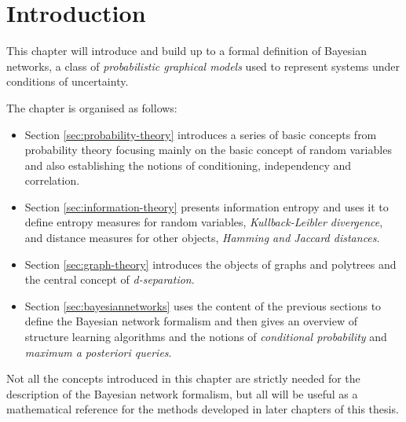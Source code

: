 \section{Introduction} \label{sec:mathematical-background-introduction}
This chapter will introduce and build up to a formal definition of Bayesian networks, a class of \textit{probabilistic graphical models} used to represent systems under conditions of uncertainty.

The chapter is organised as follows:
\begin{itemize}
  \item Section \ref{sec:probability-theory} introduces a series of basic concepts from probability theory focusing mainly on the basic concept of random variables and also establishing the notions of conditioning, independency and correlation.
  \item Section \ref{sec:information-theory} presents information entropy and uses it to define entropy measures for random variables, \textit{Kullback-Leibler divergence}, and distance measures for other objects, \textit{Hamming and Jaccard distances}.
  \item Section \ref{sec:graph-theory} introduces the objects of graphs and polytrees and the central concept of \textit{d-separation}.
  \item Section \ref{sec:bayesiannetworks} uses the content of the previous sections to define the Bayesian network formalism and then gives an overview of structure learning algorithms and the notions of \textit{conditional probability} and \textit{maximum a posteriori queries}.
\end{itemize}

Not all the concepts introduced in this chapter are strictly needed for the description of the Bayesian network formalism, but all will be useful as a mathematical reference for the methods developed in later chapters of this thesis.